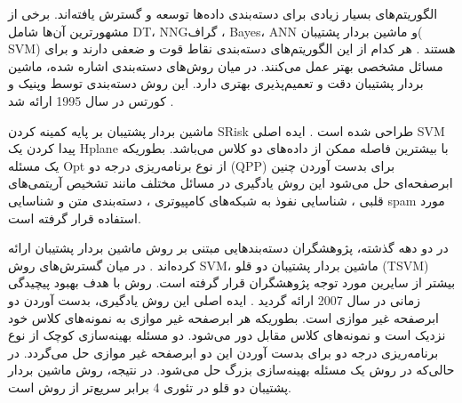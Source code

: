 الگوریتم‌های بسیار زیادی برای دسته‌بندی داده‌ها توسعه و گسترش یافته‌اند. برخی از مشهورترین آن‌ها شامل \gls{DT}، \gls{NNG}گراف ، \gls{Bayes}، \gls{ANN} و ماشین بردار پشتیبان( \gls{SVM}) هستند \cite{kotsiantis2007}. هر کدام از این الگوریتم‌های دسته‌بندی نقاط قوت و ضعفی دارند و برای مسائل مشخصی بهتر عمل می‌کنند. در میان روش‌های دسته‌بندی اشاره شده، ماشین بردار پشتیبان دقت و تعمیم‌پذیری بهتری دارد. این روش دسته‌بندی توسط وپنیک و کورتس در سال 1995 ارائه شد \cite{vapnik1995}. 

ماشین بردار پشتیبان بر پایه کمینه کردن \gls{SRisk} طراحی شده است \cite{vapnik1998}. ایده اصلی \gls{SVM} پیدا کردن یک \gls{Hplane} با بیشترین فاصله ممکن از داده‌های دو کلاس می‌باشد. بطوریکه یک مسئله  \gls{Opt} از نوع برنامه‌ریزی درجه دو (\gls{QPP}) برای بدست آوردن چنین ابرصفحه‌ای حل می‌شود این روش یادگیری در مسائل مختلف مانند تشخیص آریتمی‌های قلبی \cite{nasiri2009}، شناسایی نفوذ به شبکه‌های کامپیوتری \cite{raman2017}، دسته‌بندی متن\cite{lee2012} و شناسایی \gls{spam} \cite{zoubi2018} مورد استفاده قرار گرفته است.

در دو دهه گذشته، پژوهشگران دسته‌بندهایی مبتنی بر روش ماشین بردار پشتیبان ارائه کرده‌اند \cite{nayak2015}. در میان گسترش‌های روش \gls*{SVM}، ماشین بردار پشتیبان دو قلو (\gls{TSVM}) بیشتر از سایرین مورد توجه پژوهشگران قرار گرفته است. روش  با هدف بهبود پیچیدگی زمانی   در سال 2007 ارائه گردید \cite{jayadeva2007}. ایده اصلی این روش یادگیری، بدست آوردن دو ابرصفحه غیر موازی است. بطوریکه هر ابرصفحه غیر موازی به نمونه‌های کلاس خود نزدیک است و نمونه‌های کلاس مقابل دور می‌شود. دو مسئله بهینه‌سازی کوچک از نوع برنامه‌ریزی درجه دو برای بدست آوردن این دو ابرصفحه غیر موازی حل می‌گردد. در حالی‌که در روش  یک مسئله بهینه‌سازی بزرگ حل می‌شود. در نتیجه، روش ماشین بردار پشتیبان دو قلو در تئوری 4 برابر سریع‌تر از روش  است.




